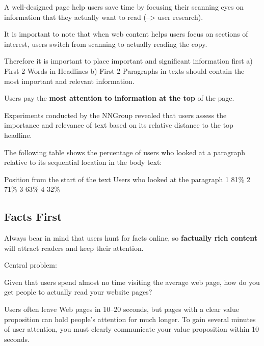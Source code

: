 
A well-designed page help users save time by focusing their scanning eyes on information that they actually want to read (--> user research).

It is important to note that when web content helps users focus on sections of interest, users switch from scanning to actually reading the copy.

Therefore it is important to place important and significant information first
a) First 2 Words in Headlines
b) First 2 Paragraphs in texts should contain the most important and relevant information.

Users pay the \textbf{most attention to information at the top} of the page.

Experiments conducted by the NNGroup revealed that users assess the importance and relevance of text based on its relative distance to the top headline. 

The following table shows the percentage of users who looked at a paragraph relative to its sequential location in the body text:

Position from the start of the text	Users who looked at the paragraph
1	81\%
2	71\%
3	63\%
4	32\%



\subsection{Facts First} %
\label{sub:fact_hunting}


Always bear in mind that users hunt for facts online, so \textbf{factually rich content} will attract readers and keep their attention.

Central problem:

Given that users spend almost no time visiting the average web page, how do you get people to actually read your website pages?

Users often leave Web pages in 10–20 seconds, but pages with a clear value proposition can hold people's attention for much longer. To gain several minutes of user attention, you must clearly communicate your value proposition within 10 seconds.

